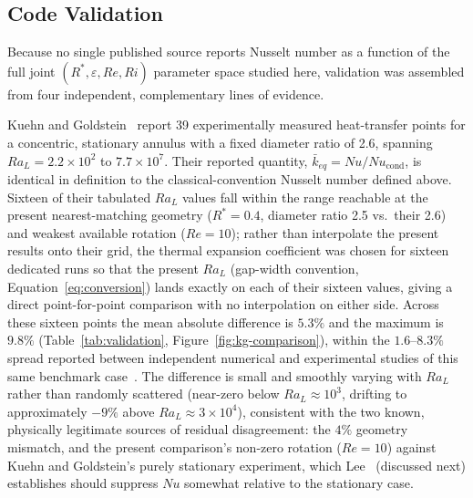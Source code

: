\subsection{Code Validation}
\label{subsec:cfd_val}

Because no single published source reports Nusselt number as a function of the full joint $(R^\ast, \varepsilon, Re, Ri)$ parameter space studied here, validation was assembled from four independent, complementary lines of evidence.

Kuehn and Goldstein~\cite{KuehnGoldstein1978} report 39 experimentally measured heat-transfer points for a concentric, stationary annulus with a fixed diameter ratio of 2.6, spanning $Ra_L = 2.2\times10^2$ to $7.7\times10^7$. Their reported quantity, $\bar k_{eq} = Nu/Nu_{\text{cond}}$, is identical in definition to the classical-convention Nusselt number defined above. Sixteen of their tabulated $Ra_L$ values fall within the range reachable at the present nearest-matching geometry ($R^\ast=0.4$, diameter ratio 2.5 vs.\ their 2.6) and weakest available rotation ($Re=10$); rather than interpolate the present results onto their grid, the thermal expansion coefficient was chosen for sixteen dedicated runs so that the present $Ra_L$ (gap-width convention, Equation~\eqref{eq:conversion}) lands exactly on each of their sixteen values, giving a direct point-for-point comparison with no interpolation on either side. Across these sixteen points the mean absolute difference is $5.3\%$ and the maximum is $9.8\%$ (Table~\ref{tab:validation}, Figure~\ref{fig:kg-comparison}), within the $1.6$--$8.3\%$ spread reported between independent numerical and experimental studies of this same benchmark case~\cite{Pranowo2024}. The difference is small and smoothly varying with $Ra_L$ rather than randomly scattered (near-zero below $Ra_L\approx10^3$, drifting to approximately $-9\%$ above $Ra_L\approx3\times10^4$), consistent with the two known, physically legitimate sources of residual disagreement: the $4\%$ geometry mismatch, and the present comparison's non-zero rotation ($Re=10$) against Kuehn and Goldstein's purely stationary experiment, which Lee~\cite{Lee1992a,Lee1992b} (discussed next) establishes should suppress $Nu$ somewhat relative to the stationary case.

